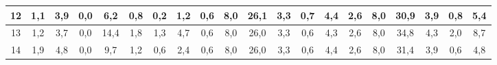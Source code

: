 \begin{sidewaystable}[]
\begin{tabular}{|c|c|c|c|c|c|c|c|c|c|c|c|c|c|c|c|c|c|c|c|}
    12 & 1,1                                             & 3,9                                             & 0,0                                             & 6,2                                              & 0,8                                              & 0,2                                              & 1,2                                              & 0,6                                              & 8,0                                              & 26,1                                             & 3,3                                              & 0,7                                              & 4,4                                              & 2,6                                              & 8,0                                              & 30,9                                             & 3,9                                              & 0,8                                              & 5,4                                              \\ \hline
    13 & 1,2                                             & 3,7                                             & 0,0                                             & 14,4                                             & 1,8                                              & 1,3                                              & 4,7                                              & 0,6                                              & 8,0                                              & 26,0                                             & 3,3                                              & 0,6                                              & 4,3                                              & 2,6                                              & 8,0                                              & 34,8                                             & 4,3                                              & 2,0                                              & 8,7                                              \\ \hline
    14 & 1,9                                             & 4,8                                             & 0,0                                             & 9,7                                              & 1,2                                              & 0,6                                              & 2,4                                              & 0,6                                              & 8,0                                              & 26,0                                             & 3,3                                              & 0,6                                              & 4,4                                              & 2,6                                              & 8,0                                              & 31,4                                             & 3,9                                              & 0,6                                              & 4,8                                              \\ \hline

\end{tabular}
\end{sidewaystable}
